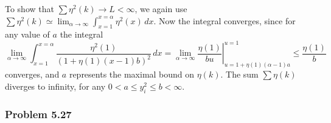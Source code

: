 \documentclass[12pt, a4paper]{article}
\begin{document}
\begin{easylist}[enumerate]
To show that $\sum \eta^2(k) \to L < \infty$, we again use $\sum \eta^2(k) \simeq \lim_{\alpha \to \infty} \int_{x=1}^{x=\alpha} \eta^2(x) \, dx $.
Now the integral converges, since for any value of $a$ the integral
\begin{equation*}
\lim_{\alpha \to \infty} \int_{x=1}^{x=\alpha} \frac{\eta^2(1)}{(1 + \eta(1)(x-1)b)^2} \, dx 
= 
\lim_{\alpha \to \infty} \left. \frac{\eta(1)}{bu} \right|_{u=1 + \eta(1) (\alpha - 1)a}^{u=1} \leq \frac{\eta(1)}{b}
\end{equation*}
converges, and $a$ represents the maximal bound on $\eta(k)$. 
The sum $\sum \eta(k)$ diverges to infinity, for any $0 < a \leq y_i^2 \leq b < \infty$.
\end{easylist}




\subsubsection*{Problem 5.27}
\end{document}
